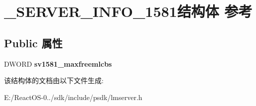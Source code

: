 \hypertarget{struct___s_e_r_v_e_r___i_n_f_o__1581}{}\section{\+\_\+\+S\+E\+R\+V\+E\+R\+\_\+\+I\+N\+F\+O\+\_\+1581结构体 参考}
\label{struct___s_e_r_v_e_r___i_n_f_o__1581}
\subsection*{Public 属性}
\begin{DoxyCompactItemize}
\item 
\mbox{\label{struct___s_e_r_v_e_r___i_n_f_o__1581_a537d513774ba181fb2e7cc6b01a1a890}} 
D\+W\+O\+RD {\bfseries sv1581\+\_\+maxfreemlcbs}
\end{DoxyCompactItemize}


该结构体的文档由以下文件生成\+:\begin{DoxyCompactItemize}
\item 
E\+:/\+React\+O\+S-\/0../sdk/include/psdk/lmserver.\+h\end{DoxyCompactItemize}
